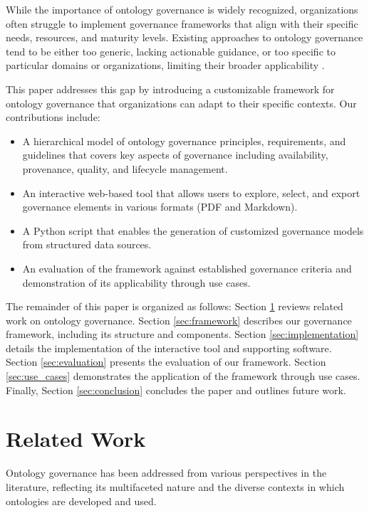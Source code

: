 \documentclass[conference]{IEEEtran}
\begin{document}
While the importance of ontology governance is widely recognized, organizations often struggle to implement governance frameworks that align with their specific needs, resources, and maturity levels. Existing approaches to ontology governance tend to be either too generic, lacking actionable guidance, or too specific to particular domains or organizations, limiting their broader applicability \cite{suarez2011survey}.

This paper addresses this gap by introducing a customizable framework for ontology governance that organizations can adapt to their specific contexts. Our contributions include:

\begin{itemize}
    \item A hierarchical model of ontology governance principles, requirements, and guidelines that covers key aspects of governance including availability, provenance, quality, and lifecycle management.
    \item An interactive web-based tool that allows users to explore, select, and export governance elements in various formats (PDF and Markdown).
    \item A Python script that enables the generation of customized governance models from structured data sources.
    \item An evaluation of the framework against established governance criteria and demonstration of its applicability through use cases.
\end{itemize}

The remainder of this paper is organized as follows: Section \ref{sec:related} reviews related work on ontology governance. Section \ref{sec:framework} describes our governance framework, including its structure and components. Section \ref{sec:implementation} details the implementation of the interactive tool and supporting software. Section \ref{sec:evaluation} presents the evaluation of our framework. Section \ref{sec:use_cases} demonstrates the application of the framework through use cases. Finally, Section \ref{sec:conclusion} concludes the paper and outlines future work.

\section{Related Work}
\label{sec:related}

Ontology governance has been addressed from various perspectives in the literature, reflecting its multifaceted nature and the diverse contexts in which ontologies are developed and used.
\end{document}
